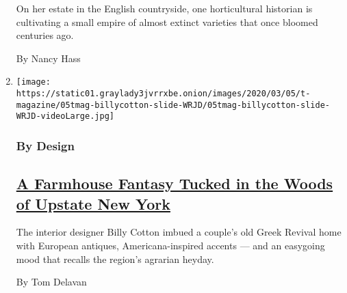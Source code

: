 \begin{enumerate}
  On her estate in the English countryside, one horticultural historian
  is cultivating a small empire of almost extinct varieties that once
  bloomed centuries ago.

  By Nancy Hass
\item
  \texttt{[image: https://static01.graylady3jvrrxbe.onion/images/2020/03/05/t-magazine/05tmag-billycotton-slide-WRJD/05tmag-billycotton-slide-WRJD-videoLarge.jpg]}

  \hypertarget{by-design}{%
  \subsubsection{By Design}\label{by-design}}

  \hypertarget{a-farmhouse-fantasy-tucked-in-the-woods-of-upstate-new-york}{%
  \subsection{\texorpdfstring{\href{/2020/02/27/t-magazine/farmhouse-upstate-new-york.html}{A
  Farmhouse Fantasy Tucked in the Woods of Upstate New
  York}}{A Farmhouse Fantasy Tucked in the Woods of Upstate New York}}\label{a-farmhouse-fantasy-tucked-in-the-woods-of-upstate-new-york}}

  The interior designer Billy Cotton imbued a couple's old Greek Revival
  home with European antiques, Americana-inspired accents --- and an
  easygoing mood that recalls the region's agrarian heyday.

  By Tom Delavan
\end{enumerate}

